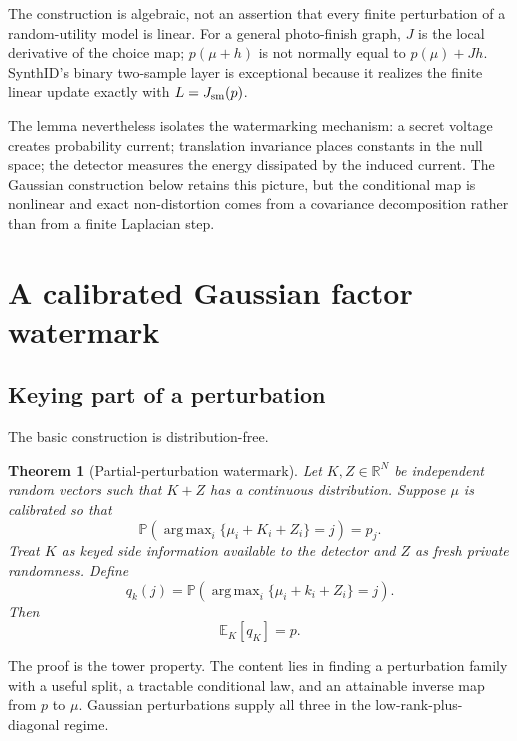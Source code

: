 \documentclass[11pt]{article}
\newtheorem{theorem}{Theorem}[section]
\theoremstyle{definition}
\theoremstyle{remark}
\DeclareMathOperator*{\argmax}{arg\,max}
\newcommand{\R}{\mathbb{R}}
\newcommand{\E}{\mathbb{E}}
\newcommand{\Pp}{\mathbb{P}}
\begin{document}
The construction is algebraic, not an assertion that every finite perturbation of a random-utility model is linear. For a general photo-finish graph, $J$ is the local derivative of the choice map; $p(\mu+h)$ is not normally equal to $p(\mu)+Jh$. SynthID's binary two-sample layer is exceptional because it realizes the finite linear update exactly with $L=J_{\rm sm}(p)$.

The lemma nevertheless isolates the watermarking mechanism: a secret voltage creates probability current; translation invariance places constants in the null space; the detector measures the energy dissipated by the induced current. The Gaussian construction below retains this picture, but the conditional map is nonlinear and exact non-distortion comes from a covariance decomposition rather than from a finite Laplacian step.

\section{A calibrated Gaussian factor watermark}
\label{sec:gaussian-watermark}

\subsection{Keying part of a perturbation}

The basic construction is distribution-free.

\begin{theorem}[Partial-perturbation watermark]
\label{thm:partial-perturbation}
Let $K,Z\in\R^N$ be independent random vectors such that $K+Z$ has a continuous distribution. Suppose $\mu$ is calibrated so that
\begin{equation}
\Pp\!\left(\argmax_i\{\mu_i+K_i+Z_i\}=j\right)=p_j.
\label{eq:calibrated-total}
\end{equation}
Treat $K$ as keyed side information available to the detector and $Z$ as fresh private randomness. Define
\begin{equation}
q_k(j)=\Pp\!\left(\argmax_i\{\mu_i+k_i+Z_i\}=j\right).
\label{eq:conditional-qk}
\end{equation}
Then
\begin{equation}
\E_K[q_K]=p.
\label{eq:tower-nondist}
\end{equation}
\end{theorem}

The proof is the tower property. The content lies in finding a perturbation family with a useful split, a tractable conditional law, and an attainable inverse map from $p$ to $\mu$. Gaussian perturbations supply all three in the low-rank-plus-diagonal regime.
\end{document}
